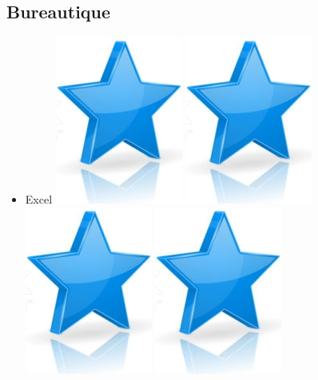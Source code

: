 \documentclass[10pt,a4paper,sans]{article}
\begin{document}
\begin{minipage}[t]{0.28\textwidth}
\begin{mdframed}[style=cadreCompetences]
        \subsection{Bureautique}
            \begin{itemize}
                \item{Excel
                    \hfill
                    \includegraphics[scale=0.20]{img/star.png} \hspace{-0.2cm}
                    \includegraphics[scale=0.20]{img/star.png} \hspace{-0.2cm}
                    \includegraphics[scale=0.20]{img/star.png} \hspace{-0.2cm}
                    \includegraphics[scale=0.20]{img/star.png} \hspace{-0.2cm}
}
\end{itemize}
\end{mdframed}
\end{minipage}
\end{document}
